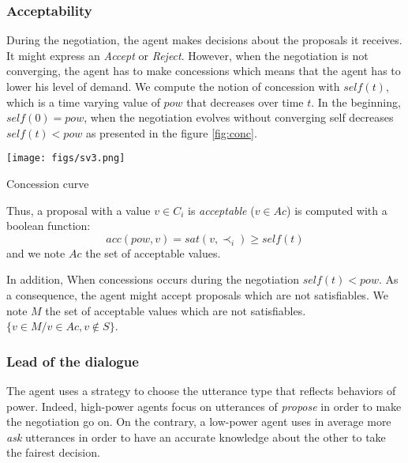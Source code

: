 \documentclass{llncs}
\begin{document}
		
	\subsubsection{Acceptability}
	 
	 During the negotiation, the agent makes decisions about the proposals it receives. It might express an \emph{Accept} or \emph{Reject}. However, when the negotiation is not converging, the agent has to make concessions which means that the agent has to lower his level of demand. 
	 We compute the notion of concession with $self(t)$, which is a time varying value of $pow$ that decreases over time $t$. In the beginning, $self(0) = pow$, when the negotiation evolves without converging self decreases $self(t) < pow$ as presented in the figure \ref{fig:conc}.
	 	\begin{floatingfigure}[r]{1.8in}
	 		\texttt{[image: figs/sv3.png]}
	 		\caption{\label{fig:conc}Concession curve}
	 	\end{floatingfigure} 
	 
	Thus, a proposal with a value $v \in C_i$ is \emph{acceptable} ($v \in Ac$) is computed with a boolean function:
			\begin{equation}
				acc(pow, v) = sat(v, \prec_i) \geq self(t)
			\end{equation}	
	and we note $Ac$ the set of acceptable values.

	In addition, When concessions occurs during the negotiation $self(t) < pow$. As a consequence, the agent might accept proposals which are not satisfiables. We note $M$ the set of acceptable values which are not satisfiables.
	$\{v \in M / v \in Ac, v \notin S\}$.
	
%	
\subsubsection{Lead of the dialogue}
	The agent uses a strategy to choose the utterance type that reflects behaviors of power. Indeed, high-power agents focus on utterances of \emph{propose} in order to make the negotiation go on. On the contrary, a low-power agent uses in average more \emph{ask} utterances in order to have an accurate knowledge about the other to take the fairest decision.
	
\end{document}
